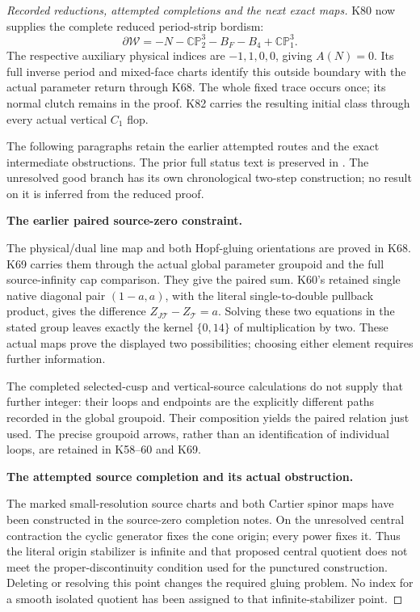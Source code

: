 \begin{proof}[Recorded reductions, attempted completions and the next exact maps]
K80 now supplies the complete reduced period-strip bordism:
\[
 \partial\mathcal W=-N-\mathbb {CP}^{3}_{2}-B_F-B_4
                                      +\mathbb {CP}^{3}_{1}.
\]
The respective auxiliary physical indices are \(-1,1,0,0\),
giving \(A(N)=0\). Its full inverse period and mixed-face
charts identify this outside boundary with the actual parameter
return through K68. The whole fixed trace occurs once; its
normal clutch remains in the proof. K82 carries the resulting
initial class through every actual vertical \(C_1\) flop.

The following paragraphs retain the earlier attempted routes
and the exact intermediate obstructions. The prior full status
text is preserved in
.
The unresolved good branch has its own chronological two-step
construction; no result on it is inferred from the reduced proof.

\par\medskip\noindent\textbf{The earlier paired source-zero constraint.}\par\nopagebreak[4]
The physical/dual line map and both Hopf-gluing orientations are
proved in K68. K69 carries them through the actual global
parameter groupoid and the full source-infinity cap comparison.
They give the paired sum. K60's retained single native diagonal
pair \((1-a,a)\), with the literal single-to-double pullback
product, gives the difference \(Z_{J\mathcal T}-Z_{\mathcal T}=a\).
Solving these two equations in the stated group leaves exactly
the kernel \(\{0,14\}\) of multiplication by two. These actual
maps prove the displayed two possibilities; choosing either
element requires further information.

The completed selected-cusp and vertical-source calculations
do not supply that further integer: their loops and endpoints
are the explicitly different paths recorded in the global
groupoid. Their composition yields the paired relation just
used. The precise groupoid arrows, rather than an identification
of individual loops, are retained in K58--60 and K69.

\par\medskip\noindent\textbf{The attempted source completion and its actual obstruction.}\par\nopagebreak[4]
The marked small-resolution source charts and both Cartier
spinor maps have been constructed in the source-zero completion
notes. On the unresolved central contraction the cyclic
generator fixes the cone origin; every power fixes it. Thus
the literal origin stabilizer is infinite and that proposed
central quotient does not meet the proper-discontinuity
condition used for the punctured construction. Deleting or
resolving this point changes the required gluing problem.
No index for a smooth isolated quotient has been assigned
to that infinite-stabilizer point.


\end{proof}
